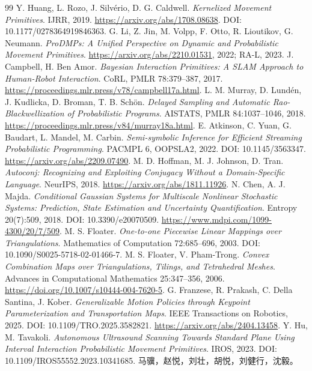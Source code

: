 \documentclass[11pt,a4paper]{article}
\numberwithin{equation}{section}
\theoremstyle{definition}
\begin{document}
\begin{thebibliography}{99}
 Y. Huang, L. Rozo, J. Silvério, D. G. Caldwell.
\emph{Kernelized Movement Primitives}. IJRR, 2019.
\url{https://arxiv.org/abs/1708.08638}. DOI: 10.1177/0278364919846363.
 G. Li, Z. Jin, M. Volpp, F. Otto, R. Lioutikov, G. Neumann.
\emph{ProDMPs: A Unified Perspective on Dynamic and Probabilistic Movement Primitives}.
\url{https://arxiv.org/abs/2210.01531}, 2022; RA-L, 2023.
 J. Campbell, H. Ben Amor.
\emph{Bayesian Interaction Primitives: A SLAM Approach to Human-Robot Interaction}.
CoRL, PMLR 78:379--387, 2017.
\url{https://proceedings.mlr.press/v78/campbell17a.html}.
 L. M. Murray, D. Lundén, J. Kudlicka, D. Broman, T. B. Schön.
\emph{Delayed Sampling and Automatic Rao-Blackwellization of Probabilistic Programs}.
AISTATS, PMLR 84:1037--1046, 2018.
\url{https://proceedings.mlr.press/v84/murray18a.html}.
 E. Atkinson, C. Yuan, G. Baudart, L. Mandel, M. Carbin.
\emph{Semi-symbolic Inference for Efficient Streaming Probabilistic Programming}.
PACMPL 6, OOPSLA2, 2022. DOI: 10.1145/3563347.
\url{https://arxiv.org/abs/2209.07490}.
 M. D. Hoffman, M. J. Johnson, D. Tran.
\emph{Autoconj: Recognizing and Exploiting Conjugacy Without a Domain-Specific Language}.
NeurIPS, 2018. \url{https://arxiv.org/abs/1811.11926}.
 N. Chen, A. J. Majda.
\emph{Conditional Gaussian Systems for Multiscale Nonlinear Stochastic Systems:
Prediction, State Estimation and Uncertainty Quantification}.
Entropy 20(7):509, 2018. DOI: 10.3390/e20070509.
\url{https://www.mdpi.com/1099-4300/20/7/509}.
 M. S. Floater.
\emph{One-to-one Piecewise Linear Mappings over Triangulations}.
Mathematics of Computation 72:685--696, 2003.
DOI: 10.1090/S0025-5718-02-01466-7.
 M. S. Floater, V. Pham-Trong.
\emph{Convex Combination Maps over Triangulations, Tilings, and Tetrahedral Meshes}.
Advances in Computational Mathematics 25:347--356, 2006.
\url{https://doi.org/10.1007/s10444-004-7620-5}.
 G. Franzese, R. Prakash, C. Della Santina, J. Kober.
\emph{Generalizable Motion Policies through Keypoint Parameterization and Transportation Maps}.
IEEE Transactions on Robotics, 2025. DOI: 10.1109/TRO.2025.3582821.
\url{https://arxiv.org/abs/2404.13458}.
 Y. Hu, M. Tavakoli.
\emph{Autonomous Ultrasound Scanning Towards Standard Plane Using Interval Interaction Probabilistic Movement Primitives}.
IROS, 2023. DOI: 10.1109/IROS55552.2023.10341685.
 马骥，赵悦，刘壮，胡悦，刘健行，沈毅。

\end{thebibliography}
\end{document}
